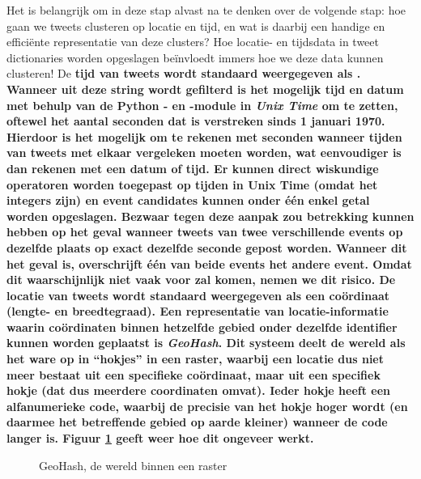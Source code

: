 {{Het is belangrijk om in deze stap alvast na te denken over de volgende stap: hoe 
gaan we tweets clusteren op locatie en tijd, en wat is daarbij een handige en 
effici\"ente representatie van deze clusters? Hoe locatie- en tijdsdata in tweet 
dictionaries worden opgeslagen beïnvloedt immers hoe we deze data kunnen 
clusteren! 
\vl
De \bf{tijd} van tweets wordt standaard weergegeven als . Wanneer uit deze string  wordt gefilterd is het mogelijk tijd en datum met behulp van 
de Python - en -module in \bf{\it{Unix Time}} om te zetten, oftewel het aantal 
seconden dat is verstreken sinds 1 januari 1970. Hierdoor is het mogelijk om te 
rekenen met seconden wanneer tijden van tweets met elkaar vergeleken moeten 
worden, wat eenvoudiger is dan rekenen met een datum of tijd. Er kunnen direct 
wiskundige operatoren worden toegepast op tijden in Unix Time (omdat het 
integers zijn) en event candidates kunnen onder één enkel getal worden 
opgeslagen. Bezwaar tegen deze aanpak zou betrekking kunnen hebben op het geval 
wanneer tweets van twee verschillende events op dezelfde plaats op exact 
dezelfde seconde gepost worden. Wanneer dit het geval is, overschrijft één van 
beide events het andere event. Omdat dit waarschijnlijk niet vaak voor zal 
komen, nemen we dit risico.
\vl
De \bf{locatie} van tweets wordt standaard weergegeven als een co\"ordinaat (lengte- en 
breedtegraad). Een representatie van locatie-informatie waarin co\"ordinaten 
binnen hetzelfde gebied onder dezelfde identifier kunnen worden geplaatst is 
\bf{\it{GeoHash}}. Dit systeem deelt de wereld als het ware op in “hokjes” in een raster, 
waarbij een locatie dus niet meer bestaat uit een specifieke co\"ordinaat, maar 
uit een specifiek hokje (dat dus meerdere coordinaten omvat). Ieder hokje heeft 
een alfanumerieke code, waarbij de precisie van het hokje hoger wordt (en 
daarmee het betreffende gebied op aarde kleiner) wanneer de code langer is. 
Figuur \ref{geohash} geeft weer hoe dit ongeveer werkt.

\begin{figure}[H]
  \centering
    \caption{GeoHash, de wereld binnen een raster}
  \label{geohash}
\end{figure}

}}
